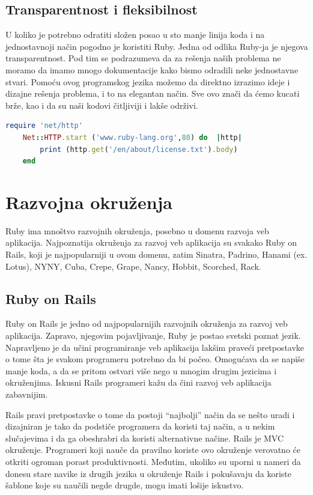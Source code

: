 \documentclass[a4paper]{article}
\begin{document}
\subsection{Transparentnost i fleksibilnost}
U koliko je potrebno odratiti složen posao u sto manje linija koda i na jednostavnoji način pogodno je koristiti Ruby. %
Jedna od odlika Ruby-ja je njegova transparentnost. Pod tim se podrazumeva da za rešenja naših problema ne moramo da imamo mnogo dokumentacije kako bismo odradili neke jednostavne stvari. Pomoću ovog programskog jezika možemo da direktno izrazimo ideje i dizajne rešenja problema, i to na elegantan način. Sve ovo znači da ćemo kucati brže, kao i da su naši kodovi čitljiviji i lakše održivi.
\begin{lstlisting}[language=Ruby]
	require 'net/http'
	Net::HTTP.start ('www.ruby-lang.org',80) do  |http|
		print (http.get('/en/about/license.txt').body)
	end
\end{lstlisting}\vspace*{-15pt}


\section{Razvojna okruženja}
Ruby ima mnoštvo razvojnih okruženja, posebno u domenu razvoja veb aplikacija. Najpoznatija okruženja za razvoj veb aplikacija su svakako Ruby on Rails, koji je najpopularniji u ovom domenu, zatim Sinatra, Padrino, Hanami (ex. Lotus), NYNY, Cuba, Crepe, Grape, Nancy, Hobbit, Scorched, Rack.
\subsection{Ruby on Rails}
Ruby on Rails je jedno od najpopularnijih razvojnih okruženja za razvoj veb aplikacija. Zapravo, njegovim pojavljivanje, Ruby je postao svetski poznat jezik. Napravljeno je da učini programiranje veb aplikacija lakšim praveći pretpostavke o tome šta je svakom programeru potrebno da bi počeo. Omogućava da se napiše manje koda, a da se pritom ostvari više nego u mnogim drugim jezicima i okruženjima. Iskusni Rails programeri kažu da čini razvoj veb aplikacija zabavnijim.

Rails pravi pretpostavke o tome da postoji “najbolji” način da se nešto uradi i dizajniran je tako da podstiče programera da koristi taj način, a u nekim slučajevima i da ga obeshrabri da koristi alternativne načine. Rails je MVC okruženje. Programeri koji nauče da pravilno koriste ovo okruženje verovatno će otkriti ogroman porast produktivnosti. Međutim, ukoliko su uporni u nameri da donesu stare navike iz drugih jezika u okruženje Rails i pokušavaju da koriste šablone koje su naučili negde drugde, mogu imati lošije iskustvo.
\end{document}
